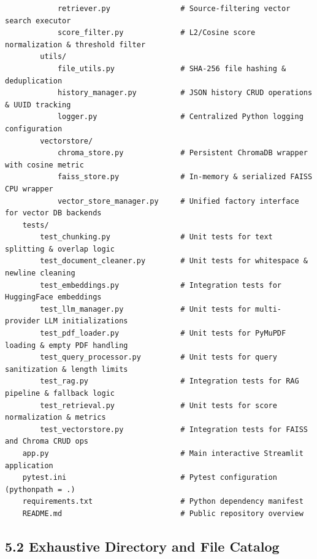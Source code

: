 \documentclass[
]{article}
\begin{document}
\begin{verbatim}
            retriever.py                # Source-filtering vector search executor
            score_filter.py             # L2/Cosine score normalization & threshold filter
        utils/
            file_utils.py               # SHA-256 file hashing & deduplication
            history_manager.py          # JSON history CRUD operations & UUID tracking
            logger.py                   # Centralized Python logging configuration
        vectorstore/
            chroma_store.py             # Persistent ChromaDB wrapper with cosine metric
            faiss_store.py              # In-memory & serialized FAISS CPU wrapper
            vector_store_manager.py     # Unified factory interface for vector DB backends
    tests/
        test_chunking.py                # Unit tests for text splitting & overlap logic
        test_document_cleaner.py        # Unit tests for whitespace & newline cleaning
        test_embeddings.py              # Integration tests for HuggingFace embeddings
        test_llm_manager.py             # Unit tests for multi-provider LLM initializations
        test_pdf_loader.py              # Unit tests for PyMuPDF loading & empty PDF handling
        test_query_processor.py         # Unit tests for query sanitization & length limits
        test_rag.py                     # Integration tests for RAG pipeline & fallback logic
        test_retrieval.py               # Unit tests for score normalization & metrics
        test_vectorstore.py             # Integration tests for FAISS and Chroma CRUD ops
    app.py                              # Main interactive Streamlit application
    pytest.ini                          # Pytest configuration (pythonpath = .)
    requirements.txt                    # Python dependency manifest
    README.md                           # Public repository overview
\end{verbatim}

\subsection{5.2 Exhaustive Directory and File
Catalog}\label{exhaustive-directory-and-file-catalog}
\end{document}
